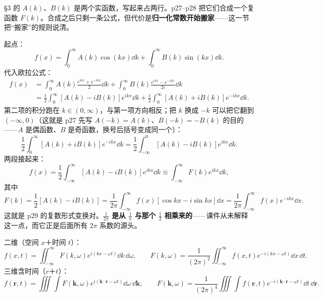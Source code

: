 \documentclass[11pt]{ctexart}
\begin{document}


§3 的 $A(k)$、$B(k)$ 是两个实函数，写起来占两行。p27--p28 把它们合成一个复函数 $F(k)$。合成之后只剩一条公式，但代价是\textbf{归一化常数开始搬家}——这一节把“搬家”的规则说清。


起点：
\[ f(x)=\int_0^{\infty}A(k)\cos(kx)\dd k+\int_0^{\infty}B(k)\sin(kx)\dd k .\]
代入欧拉公式：
\[
\begin{aligned}
f(x)&=\int_0^{\infty}A(k)\frac{e^{ikx}+e^{-ikx}}{2}\dd k+\int_0^{\infty}B(k)\frac{e^{ikx}-e^{-ikx}}{2i}\dd k\\
&=\frac{1}{2}\int_0^{\infty}\left[A(k)-iB(k)\right]e^{ikx}\dd k+\frac{1}{2}\int_0^{\infty}\left[A(k)+iB(k)\right]e^{-ikx}\dd k .
\end{aligned}
\]
第二项的积分跑在 $k\in(0,\infty)$，与第一项方向相反；把 $k$ 换成 $-k$ 可以把它翻到 $(-\infty,0)$（这就是 p27 先写 $A(-k)=A(k)$、$B(-k)=-B(k)$ 的目的——$A$ 是偶函数、$B$ 是奇函数，换号后括号变成同一个）：
\[
\frac{1}{2}\int_0^{\infty}\left[A(k)+iB(k)\right]e^{-ikx}\dd k
=\frac{1}{2}\int_{-\infty}^{0}\left[A(k)-iB(k)\right]e^{ikx}\dd k .
\]
两段接起来：
\[
f(x)=\frac{1}{2}\int_{-\infty}^{\infty}\left[A(k)-iB(k)\right]e^{ikx}\dd k\equiv\int_{-\infty}^{\infty}F(k)e^{ikx}\dd k ,
\]
其中
\[
F(k)=\frac{1}{2}\left[A(k)-iB(k)\right]
=\frac{1}{2\pi}\int_{-\infty}^{\infty}f(x)\left[\cos kx-i\sin kx\right]\dd x
=\frac{1}{2\pi}\int_{-\infty}^{\infty}f(x)e^{-ikx}\dd x .
\]
这就是 p29 的复数形式变换对。\textbf{$\frac{1}{2\pi}$ 是从 $\frac{1}{\pi}$ 与那个 $\frac12$ 相乘来的}——课件从未解释这一点，而它正是后面所有 $2\pi$ 系数的源头。


二维（空间 $x$＋时间 $t$）：
\[
f(x,t)=\iint_{-\infty}^{\infty}F(k,\omega)e^{i(kx-\omega t)}\dd k\,\dd\omega,\qquad
F(k,\omega)=\frac{1}{(2\pi)^{2}}\iint_{-\infty}^{\infty}f(x,t)e^{-i(kx-\omega t)}\dd x\,\dd t .
\]
三维含时间（$r$＋$t$）：
\[
f(\mathbf{r},t)=\iiint\!\!\int F(\mathbf{k},\omega)e^{i(\mathbf{k}\cdot\mathbf{r}-\omega t)}\dd\omega\,\dd\mathbf{k},\qquad
F(\mathbf{k},\omega)=\frac{1}{(2\pi)^{4}}\iiint\!\!\int f(\mathbf{r},t)e^{-i(\mathbf{k}\cdot\mathbf{r}-\omega t)}\dd t\,\dd\mathbf{r} .
\]
\end{document}

